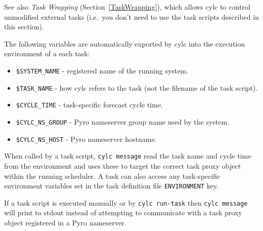 
See also {\em Task Wrapping} (Section~\ref{TaskWrapping}), which allows
cylc to control unmodified external tasks (i.e.\ you don't need to 
use the task scripts described in this section).

\lstset{language=bash}

The following variables are automatically exported by cylc into
the execution environment of a each task:
\begin{itemize}
   \item \lstinline=$SYSTEM_NAME= - registered name of the running system.
   \item \lstinline=$TASK_NAME= - how cylc refers to the task (not the
       filename of the task script). 
   \item \lstinline=$CYCLE_TIME= - task-specific forecast cycle time.
   \item \lstinline=$CYLC_NS_GROUP= - Pyro nameserver group name used by the system.
   \item \lstinline=$CYLC_NS_HOST= - Pyro nameserver hostname.
\end{itemize}

\lstset{language=bash}
When called by a task script, \lstinline=cylc message= read the task
name and cycle time from the environment and uses these to target the
correct task proxy object within the running scheduler.
\lstset{language=cylctaskdef=}
A task can also access any task-specific
environment variables set in the task definition file
\lstinline=ENVIRONMENT= key.

\lstset{language=bash}

If a task script is executed manually or by \lstinline=cylc run-task=
then \lstinline=cylc message= will print to stdout instead of attempting
to communicate with a task proxy object registered in a Pyro nameserver.
